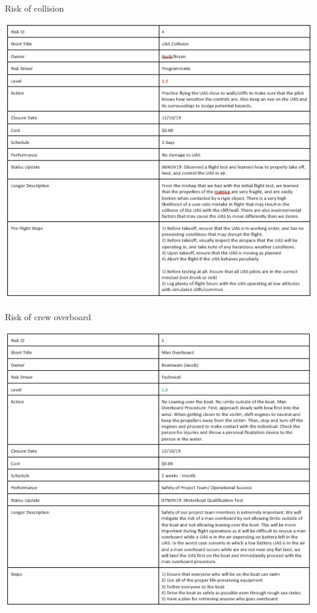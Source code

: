 \documentclass{wrcecapstone}
\begin{document}
\begin{table}
\caption{Risk of collision}
\label{tab:8.3.1d}
\includegraphics[width=\columnwidth]{figures/table-831d.jpg}
\end{table}

\begin{table}
\caption{Risk of crew overboard}
\label{tab:8.3.1e}
\includegraphics[width=\columnwidth]{figures/table-831e.jpg}
\end{table}
\end{document}
